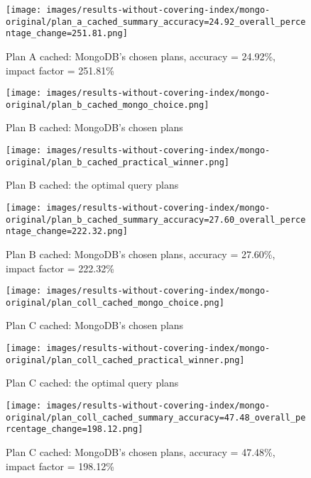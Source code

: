 \begin{figure}[htb]
    \centering
    \texttt{[image: images/results-without-covering-index/mongo-original/plan\_a\_cached\_summary\_accuracy=24.92\_overall\_percentage\_change=251.81.png]}
    \caption{Plan A cached: MongoDB's chosen plans, accuracy = 24.92\%, impact factor = 251.81\%}
    \label{fig:a-cached-impact-v0}
\end{figure}


\begin{figure}[htb]
    \centering
    \texttt{[image: images/results-without-covering-index/mongo-original/plan\_b\_cached\_mongo\_choice.png]}
    \caption{Plan B cached: MongoDB's chosen plans}
    \label{fig:b-cached-v0}
\end{figure}


\begin{figure}[htb]
    \centering
    \texttt{[image: images/results-without-covering-index/mongo-original/plan\_b\_cached\_practical\_winner.png]}
    \caption{Plan B cached: the optimal query plans}
    \label{fig:b-cached-optimal-v0}
\end{figure}


\begin{figure}[htb]
    \centering
    \texttt{[image: images/results-without-covering-index/mongo-original/plan\_b\_cached\_summary\_accuracy=27.60\_overall\_percentage\_change=222.32.png]}
    \caption{Plan B cached: MongoDB's chosen plans, accuracy = 27.60\%, impact factor = 222.32\%}
    \label{fig:b-cached-impact-v0}
\end{figure}


\begin{figure}[htb]
    \centering
    \texttt{[image: images/results-without-covering-index/mongo-original/plan\_coll\_cached\_mongo\_choice.png]}
    \caption{Plan C cached: MongoDB's chosen plans}
    \label{fig:c-cached-v0}
\end{figure}


\begin{figure}[htb]
    \centering
    \texttt{[image: images/results-without-covering-index/mongo-original/plan\_coll\_cached\_practical\_winner.png]}
    \caption{Plan C cached: the optimal query plans}
    \label{fig:c-cached-optimal-v0}
\end{figure}


\begin{figure}[htb]
    \centering
    \texttt{[image: images/results-without-covering-index/mongo-original/plan\_coll\_cached\_summary\_accuracy=47.48\_overall\_percentage\_change=198.12.png]}
    \caption{Plan C cached: MongoDB's chosen plans, accuracy = 47.48\%, impact factor = 198.12\%}
    \label{fig:c-cached-impact-v0}
\end{figure}


\clearpage